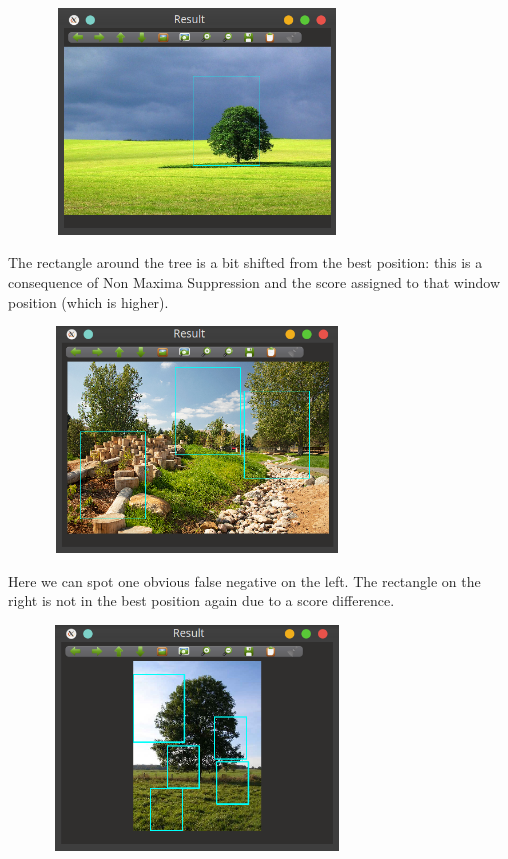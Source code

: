 \documentclass[]{report}
\begin{document}
\vspace{0.5cm}
\begin{center}
	\includegraphics[width=10cm,height=6cm]{img/final/1}
\end{center}
\vspace{0.5cm}

The rectangle around the tree is a bit shifted from the best position: this is a consequence of Non Maxima Suppression and the score assigned to that window position (which is higher).

\vspace{0.5cm}
\begin{center}
	\includegraphics[width=10cm,height=6cm]{img/final/2}
\end{center}
\vspace{0.5cm}

Here we can spot one obvious false negative on the left. The rectangle on the right is not in the best position again due to a score difference.

\vspace{0.5cm}
\begin{center}
	\includegraphics[width=10cm,height=6cm]{img/final/3}
\end{center}
\vspace{0.5cm}
\end{document}
